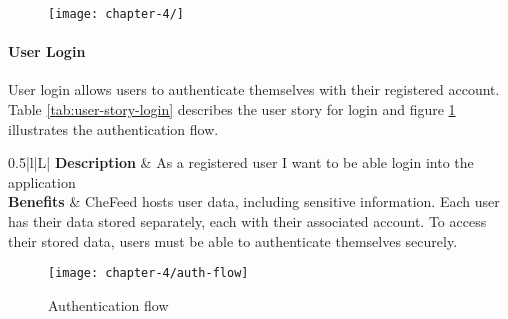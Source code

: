 \begin{figure}
    \texttt{[image: chapter-4/]}
\end{figure}

\paragraph{User Login}
User login allows users to authenticate themselves with their registered account. Table \ref{tab:user-story-login} describes the user story for login and figure \ref{fig:auth-flow} illustrates the authentication flow.

\begin{table}
    \centering
    \caption{User story - Login}
    \label{tab:user-story-login}
    \begin{tabulary}{0.5\textwidth}{|l|L|}
        \hline
        \textbf{Description} & As a registered user I want to be able login into the application \\
        \hline
        \textbf{Benefits} & CheFeed hosts user data, including sensitive information. Each user has their data stored separately, each with their associated account. To access their stored data, users must be able to authenticate themselves securely. \\
        \hline
    \end{tabulary}
\end{table}

\begin{figure}
    \texttt{[image: chapter-4/auth-flow]}
    \caption{Authentication flow}
    \label{fig:auth-flow}
\end{figure}

